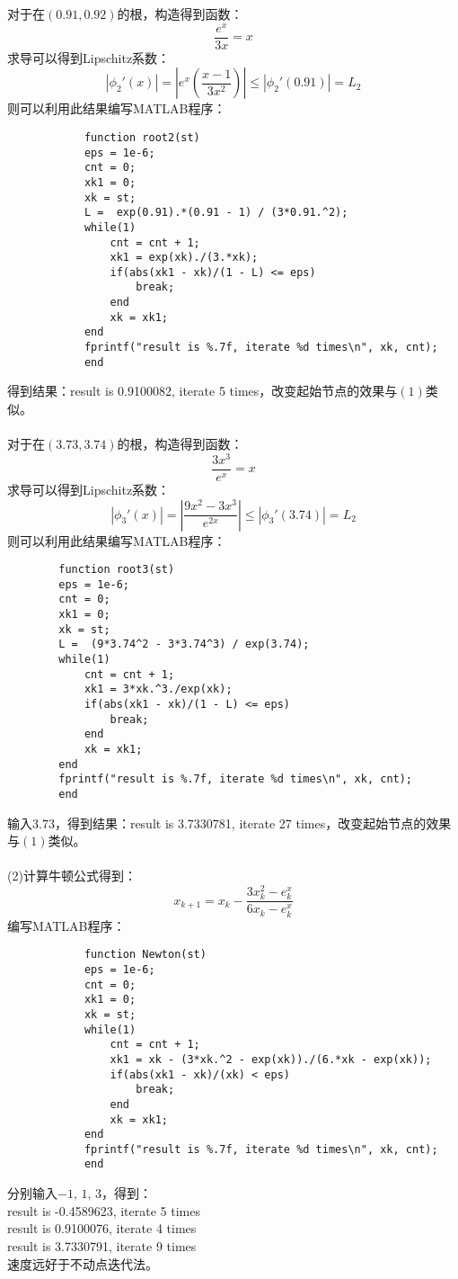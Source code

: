 \documentclass{article}
\begin{document}
\begin{itemize}
		对于在$(0.91, 0.92)$的根，构造得到函数：
		$$\frac{e^x}{3x} = x$$
		求导可以得到Lipschitz系数：
		$$|\phi_{2}'(x)| =\left| e^{x}\left(\frac{x- 1}{3x^2}\right)\right| \le |\phi_{2}'(0.91)| = L_2$$
		则可以利用此结果编写MATLAB程序：
		\begin{lstlisting}
			function root2(st)
			eps = 1e-6;
			cnt = 0;
			xk1 = 0;
			xk = st;
			L =  exp(0.91).*(0.91 - 1) / (3*0.91.^2);
			while(1)
				cnt = cnt + 1;
				xk1 = exp(xk)./(3.*xk);
				if(abs(xk1 - xk)/(1 - L) <= eps)
					break;
				end
				xk = xk1;
			end
			fprintf("result is %.7f, iterate %d times\n", xk, cnt);
			end
		\end{lstlisting}
		得到结果：result is 0.9100082, iterate 5 times，改变起始节点的效果与$(1)$类似。\\\\

		对于在$(3.73, 3.74)$的根，构造得到函数：
		$$\frac{3x^3}{e^x} = x$$
		求导可以得到Lipschitz系数：
		$$|\phi_{3}'(x)| =\left|\frac{9x^2 - 3x^3}{e^{2x}}\right| \le |\phi_{3}'(3.74)| = L_2$$
		则可以利用此结果编写MATLAB程序：
		\begin{lstlisting}
		function root3(st)
		eps = 1e-6;
		cnt = 0;
		xk1 = 0;
		xk = st;
		L =  (9*3.74^2 - 3*3.74^3) / exp(3.74);
		while(1)
			cnt = cnt + 1;
			xk1 = 3*xk.^3./exp(xk);
			if(abs(xk1 - xk)/(1 - L) <= eps)
				break;
			end
			xk = xk1;
		end
		fprintf("result is %.7f, iterate %d times\n", xk, cnt);
		end
		\end{lstlisting}
		输入3.73，得到结果：result is 3.7330781, iterate 27 times，改变起始节点的效果与$(1)$类似。\\\\
		(2)计算牛顿公式得到：
		$$x_{k+1} = x_k - \frac{3x_k^2 - e^x_k}{6x_k - e^x_k}$$
		编写MATLAB程序：
		\begin{lstlisting}
			function Newton(st)
			eps = 1e-6;
			cnt = 0;
			xk1 = 0;
			xk = st;
			while(1)
				cnt = cnt + 1;
				xk1 = xk - (3*xk.^2 - exp(xk))./(6.*xk - exp(xk));
				if(abs(xk1 - xk)/(xk) < eps)
					break;
				end
				xk = xk1;
			end
			fprintf("result is %.7f, iterate %d times\n", xk, cnt);
			end
		\end{lstlisting}
		分别输入$-1,\, 1,\, 3$，得到：\\
		result is -0.4589623, iterate 5 times\\
		result is 0.9100076, iterate 4 times\\
		result is 3.7330791, iterate 9 times\\
		速度远好于不动点迭代法。
	\end{itemize}
\end{document}
